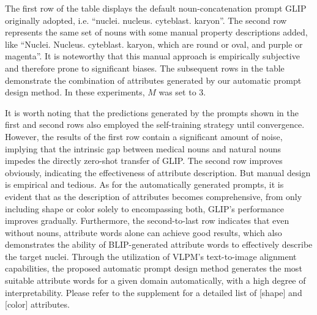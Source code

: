 \documentclass[runningheads]{llncs}
\begin{document}

The first row of the table displays the default noun-concatenation prompt GLIP originally adopted, i.e. ``nuclei. nucleus. cyteblast. karyon''. The second row represents the same set of nouns with some manual property descriptions added, like ``Nuclei. Nucleus. cyteblast. karyon, which are round or oval, and purple or magenta''. It is noteworthy that this manual approach is empirically subjective and therefore prone to significant biases. The subsequent rows in the table demonstrate the combination of attributes generated by our automatic prompt design method. In these experiments, $M$ was set to 3. 

It is worth noting that the predictions generated by the prompts shown in the first and second rows also employed the self-training strategy until convergence. However, the results of the first row contain a significant amount of noise, implying that the intrinsic gap between medical nouns and natural nouns impedes the directly zero-shot transfer of GLIP. The second row improves obviously, indicating the effectiveness of attribute description. But manual design is empirical and tedious. As for the automatically generated prompts, it is evident that as the description of attributes becomes comprehensive, from only including shape or color solely to encompassing both, GLIP's performance improves gradually. Furthermore, the second-to-last row indicates that even without nouns, attribute words alone can achieve good results, which also demonstrates the ability of BLIP-generated attribute words to effectively describe the target nuclei. Through the utilization of VLPM's text-to-image alignment capabilities, the proposed automatic prompt design method generates the most suitable attribute words for a given domain automatically, with a high degree of interpretability. Please refer to the supplement for a detailed list of [shape] and [color] attributes.
\end{document}
